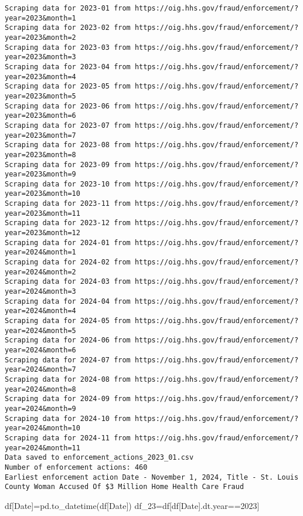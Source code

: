 \documentclass[
  letterpaper,
  DIV=11,
  numbers=noendperiod]{scrartcl}
\newenvironment{Shaded}{\begin{snugshade}}{\end{snugshade}}
\newcommand{\DecValTok}[1]{\textcolor[rgb]{0.68,0.00,0.00}{#1}}
\newcommand{\NormalTok}[1]{\textcolor[rgb]{0.00,0.23,0.31}{#1}}
\newcommand{\OperatorTok}[1]{\textcolor[rgb]{0.37,0.37,0.37}{#1}}
\newcommand{\StringTok}[1]{\textcolor[rgb]{0.13,0.47,0.30}{#1}}
\begin{document}
\begin{verbatim}
Scraping data for 2023-01 from https://oig.hhs.gov/fraud/enforcement/?year=2023&month=1
Scraping data for 2023-02 from https://oig.hhs.gov/fraud/enforcement/?year=2023&month=2
Scraping data for 2023-03 from https://oig.hhs.gov/fraud/enforcement/?year=2023&month=3
Scraping data for 2023-04 from https://oig.hhs.gov/fraud/enforcement/?year=2023&month=4
Scraping data for 2023-05 from https://oig.hhs.gov/fraud/enforcement/?year=2023&month=5
Scraping data for 2023-06 from https://oig.hhs.gov/fraud/enforcement/?year=2023&month=6
Scraping data for 2023-07 from https://oig.hhs.gov/fraud/enforcement/?year=2023&month=7
Scraping data for 2023-08 from https://oig.hhs.gov/fraud/enforcement/?year=2023&month=8
Scraping data for 2023-09 from https://oig.hhs.gov/fraud/enforcement/?year=2023&month=9
Scraping data for 2023-10 from https://oig.hhs.gov/fraud/enforcement/?year=2023&month=10
Scraping data for 2023-11 from https://oig.hhs.gov/fraud/enforcement/?year=2023&month=11
Scraping data for 2023-12 from https://oig.hhs.gov/fraud/enforcement/?year=2023&month=12
Scraping data for 2024-01 from https://oig.hhs.gov/fraud/enforcement/?year=2024&month=1
Scraping data for 2024-02 from https://oig.hhs.gov/fraud/enforcement/?year=2024&month=2
Scraping data for 2024-03 from https://oig.hhs.gov/fraud/enforcement/?year=2024&month=3
Scraping data for 2024-04 from https://oig.hhs.gov/fraud/enforcement/?year=2024&month=4
Scraping data for 2024-05 from https://oig.hhs.gov/fraud/enforcement/?year=2024&month=5
Scraping data for 2024-06 from https://oig.hhs.gov/fraud/enforcement/?year=2024&month=6
Scraping data for 2024-07 from https://oig.hhs.gov/fraud/enforcement/?year=2024&month=7
Scraping data for 2024-08 from https://oig.hhs.gov/fraud/enforcement/?year=2024&month=8
Scraping data for 2024-09 from https://oig.hhs.gov/fraud/enforcement/?year=2024&month=9
Scraping data for 2024-10 from https://oig.hhs.gov/fraud/enforcement/?year=2024&month=10
Scraping data for 2024-11 from https://oig.hhs.gov/fraud/enforcement/?year=2024&month=11
Data saved to enforcement_actions_2023_01.csv
Number of enforcement actions: 460
Earliest enforcement action Date - November 1, 2024, Title - St. Louis County Woman Accused Of $3 Million Home Health Care Fraud
\end{verbatim}

\begin{Shaded}
\begin{Highlighting}[]
\NormalTok{df[}\StringTok{\textquotesingle{}Date\textquotesingle{}}\NormalTok{]}\OperatorTok{=}\NormalTok{pd.to\_datetime(df[}\StringTok{\textquotesingle{}Date\textquotesingle{}}\NormalTok{])}
\NormalTok{df\_23}\OperatorTok{=}\NormalTok{df[df[}\StringTok{\textquotesingle{}Date\textquotesingle{}}\NormalTok{].dt.year}\OperatorTok{==}\DecValTok{2023}\NormalTok{]}
\end{Highlighting}
\end{Shaded}
\end{document}
